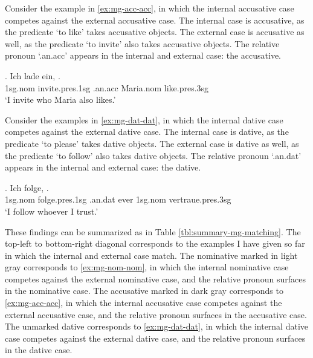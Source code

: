 Consider the example in \ref{ex:mg-acc-acc}, in which the internal accusative case competes against the external accusative case.
The internal case is accusative, as the predicate  `to like' takes accusative objects.
The external case is accusative as well, as the predicate  `to invite' also takes accusative objects.
The relative pronoun  `.\ac{an}.\ac{acc}' appears in the internal and external case: the accusative.

\exg. Ich {lade ein},    .\\
 1\ac{sg}.\ac{nom} invite.\ac{pres}.1\ac{sg}\scsub{[acc]} .\ac{an}.\ac{acc} Maria.\ac{nom} like.\ac{pres}.3\ac{sg}\scsub{[acc]}\\
 `I invite who Maria also likes.' \label{ex:mg-acc-acc}

Consider the examples in \ref{ex:mg-dat-dat}, in which the internal dative case competes against the external dative case.
The internal case is dative, as the predicate  `to please' takes dative objects.
The external case is dative as well, as the predicate  `to follow' also takes dative objects.
The relative pronoun  `.\ac{an}.\ac{dat}' appears in the internal and external case: the dative.

\exg. Ich folge,    .\\
 1\ac{sg}.\ac{nom} folge.\ac{pres}.1\ac{sg}\scsub{[dat]} .\ac{an}.\ac{dat} ever 1\ac{sg}.\ac{nom} vertraue.\ac{pres}.3\ac{sg}\scsub{[dat]}\\
 `I follow whoever I trust.' \label{ex:mg-dat-dat}

These findings can be summarized as in Table \ref{tbl:summary-mg-matching}. The top-left to bottom-right diagonal corresponds to the examples I have given so far in which the internal and external case match. The nominative marked in light gray corresponds to \ref{ex:mg-nom-nom}, in which the internal nominative case competes against the external nominative case, and the relative pronoun surfaces in the nominative case. The accusative marked in dark gray corresponds to \ref{ex:mg-acc-acc}, in which the internal accusative case competes against the external accusative case, and the relative pronoun surfaces in the accusative case. The unmarked dative corresponds to \ref{ex:mg-dat-dat}, in which the internal dative case competes against the external dative case, and the relative pronoun surfaces in the dative case.

